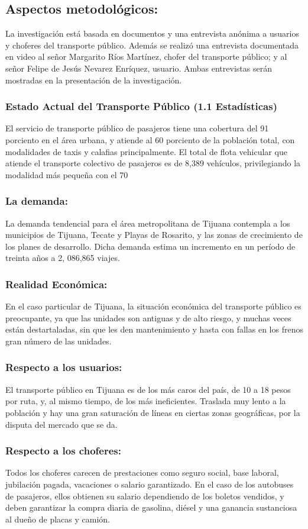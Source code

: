 \documentclass{bmcart}
\begin{document}
\subsection{Aspectos metodológicos:}
La investigación está basada en documentos y  una entrevista anónima a usuarios y choferes del transporte público.
Además se realizó una entrevista documentada en video al señor Margarito Ríos Martínez, chofer del transporte público; y al señor Felipe de Jesús Nevarez Enríquez, usuario. Ambas entrevistas serán mostradas en la presentación de la investigación.
\subsubsection{Estado Actual del Transporte Público  (1.1 Estadísticas)}
El servicio de transporte público de pasajeros tiene una cobertura del 91 porciento en el área urbana, y atiende al 60 porciento de la población total, con modalidades de taxis y calafias principalmente. 
El total de flota vehicular que atiende el transporte colectivo de pasajeros es de 8,389 vehículos, privilegiando la modalidad más pequeña con el 70%
\subsubsection{La demanda:}
La demanda tendencial para el área metropolitana de Tijuana contempla a los municipios de Tijuana, Tecate y Playas de Rosarito, y las zonas de crecimiento de los planes de desarrollo. Dicha demanda estima un incremento en un período de treinta años a 2, 086,865 viajes.
\subsubsection{Realidad Económica:}
En el caso particular de Tijuana, la situación económica del transporte público es preocupante, ya que las unidades son antiguas y de alto riesgo, y muchas veces están destartaladas, sin que les den mantenimiento y hasta con fallas en los frenos gran número de las unidades.
\subsubsection{Respecto a los usuarios:}
El transporte público en Tijuana es de los más caros del país, de 10 a 18 pesos por ruta, y, al mismo tiempo, de los más ineficientes. Traslada muy lento a la población y hay una gran saturación de líneas en ciertas zonas geográficas, por la disputa del mercado que se da. 
\subsubsection{Respecto a los choferes:}
Todos los choferes carecen de prestaciones como seguro social, base laboral, jubilación pagada, vacaciones o salario garantizado. En el caso de los autobuses de pasajeros, ellos obtienen su salario dependiendo de los boletos vendidos, y deben garantizar la compra diaria de gasolina, diésel y una ganancia sustanciosa al dueño de placas y camión.
\end{document}
